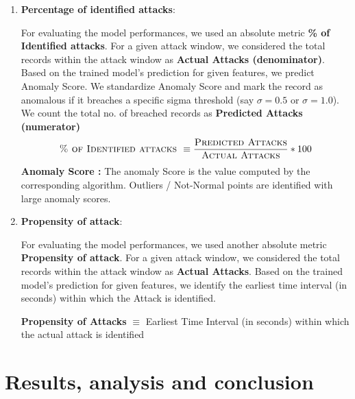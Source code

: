 \documentclass{article}
\begin{document}
\begin{enumerate}
    \item \textbf{\textsf{Percentage of identified attacks}}: \par For evaluating the model performances, we used an absolute metric \textbf{\% of Identified attacks}. For a given attack window, we considered the total records within the attack window as  \textbf{Actual Attacks (denominator)}. Based on the trained model's prediction for given features, we predict Anomaly Score. We standardize Anomaly Score and mark the record as anomalous if it breaches a specific sigma threshold (say $\sigma = 0.5$ or $\sigma = 1.0$). We count the total no. of breached records as \textbf{Predicted Attacks (numerator)}
    \begin{equation}
        \textsc{\% of Identified attacks } \equiv
           \frac{\textsc{Predicted Attacks}}{\textsc{Actual Attacks}} *100
    \end{equation}
    \textbf{Anomaly Score : }\cite{eleven}The anomaly Score is the value computed by the corresponding algorithm. Outliers / Not-Normal points are identified with large anomaly scores. 
  
    \item \textbf{\textsf{Propensity of attack}}: \par For evaluating the model performances, we used another absolute metric \textbf{Propensity of attack}. For a given attack window, we considered the total records within the attack window as  \textbf{Actual Attacks}. Based on the trained model's prediction for given features, we identify the earliest time interval (in seconds) within which the Attack is identified. \par
    
        \textbf{Propensity of Attacks } $\equiv$ \textsf{Earliest Time Interval (in seconds) within which the actual attack is identified}        
\end{enumerate}

\clearpage

\section{Results, analysis and conclusion} \label{analysisConclusion}
\end{document}
